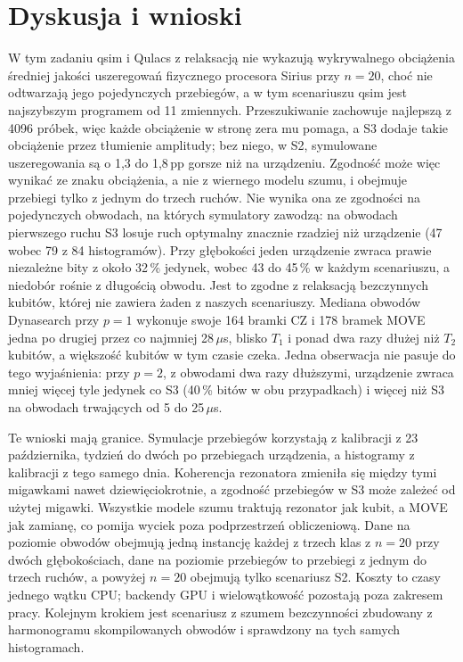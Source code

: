 \documentclass{scspaperproc}
\begin{document}


\section{Dyskusja i wnioski}

W tym zadaniu qsim i Qulacs z relaksacją nie wykazują wykrywalnego obciążenia
średniej jakości uszeregowań fizycznego procesora Sirius przy $n = 20$, choć nie odtwarzają jego
pojedynczych przebiegów, a w tym scenariuszu qsim jest najszybszym programem
od 11 zmiennych. Przeszukiwanie zachowuje najlepszą z 4096 próbek, więc każde
obciążenie w stronę zera mu pomaga, a S3 dodaje takie obciążenie przez
tłumienie amplitudy; bez niego, w S2, symulowane uszeregowania są o 1,3 do
1,8\,pp gorsze niż na urządzeniu. Zgodność może więc wynikać ze znaku
obciążenia, a nie z wiernego modelu szumu, i obejmuje przebiegi tylko
z jednym do trzech ruchów. Nie wynika ona ze zgodności na pojedynczych
obwodach, na których symulatory zawodzą: na obwodach pierwszego ruchu S3
losuje ruch optymalny znacznie rzadziej niż urządzenie (47 wobec 79 z 84
histogramów). Przy głębokości jeden urządzenie zwraca prawie niezależne bity
z około 32\,\% jedynek, wobec 43 do 45\,\% w każdym scenariuszu, a niedobór
rośnie z długością obwodu. Jest to zgodne z relaksacją bezczynnych kubitów,
której nie zawiera żaden z naszych scenariuszy. Mediana obwodów Dynasearch przy
$p = 1$ wykonuje swoje 164 bramki CZ i 178 bramek MOVE jedna po drugiej przez
co najmniej 28\,$\mu$s, blisko $T_1$ i ponad dwa razy dłużej niż $T_2$ kubitów,
a większość kubitów w tym czasie czeka. Jedna obserwacja nie pasuje do tego
wyjaśnienia: przy $p = 2$, z obwodami dwa razy dłuższymi, urządzenie zwraca
mniej więcej tyle jedynek co S3 (40\,\% bitów w obu przypadkach) i więcej niż
S3 na obwodach trwających od 5 do 25\,$\mu$s.

Te wnioski mają granice. Symulacje przebiegów korzystają z kalibracji
z 23 października, tydzień do dwóch po przebiegach urządzenia, a histogramy
z kalibracji z tego samego dnia. Koherencja rezonatora zmieniła się między tymi migawkami
nawet dziewięciokrotnie, a zgodność przebiegów w S3
może zależeć od użytej migawki. Wszystkie modele szumu traktują rezonator jak
kubit, a MOVE jak zamianę, co pomija wyciek poza podprzestrzeń obliczeniową.
Dane na poziomie obwodów obejmują jedną instancję każdej z trzech klas
z $n = 20$ przy dwóch głębokościach, dane na poziomie przebiegów to przebiegi
z jednym do trzech ruchów, a powyżej $n = 20$ obejmują tylko scenariusz S2.
Koszty to czasy jednego wątku CPU; backendy GPU i wielowątkowość
pozostają poza zakresem pracy. Kolejnym krokiem jest scenariusz z szumem
bezczynności zbudowany z harmonogramu skompilowanych obwodów i sprawdzony na
tych samych histogramach.

\FloatBarrier


\end{document}
